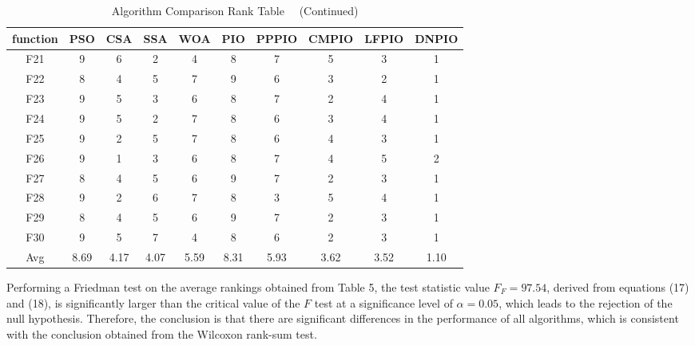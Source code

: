 \documentclass[preprint,review,compress,12pt]{elsarticle}
\begin{document}
\begin{table}[H]
\renewcommand{\thetable}{5}
\centering
\caption{Algorithm Comparison Rank Table \ \ (Continued)}
\begin{tabular}{cccccccccc}
\toprule
function   & PSO  & CSA  & SSA  & WOA  & PIO  & PPPIO & CMPIO & LFPIO & DNPIO \\
\midrule
F21 & 9    & 6    & 2    & 4    & 8    & 7     & 5     & 3     & 1     \\
F22 & 8    & 4    & 5    & 7    & 9    & 6     & 3     & 2     & 1     \\
F23 & 9    & 5    & 3    & 6    & 8    & 7     & 2     & 4     & 1     \\
F24 & 9    & 5    & 2    & 7    & 8    & 6     & 3     & 4     & 1     \\
F25 & 9    & 2    & 5    & 7    & 8    & 6     & 4     & 3     & 1     \\
F26 & 9    & 1    & 3    & 6    & 8    & 7     & 4     & 5     & 2     \\
F27 & 8    & 4    & 5    & 6    & 9    & 7     & 2     & 3     & 1     \\
F28 & 9    & 2    & 6    & 7    & 8    & 3     & 5     & 4     & 1     \\
F29 & 8    & 4    & 5    & 6    & 9    & 7     & 2     & 3     & 1     \\
F30 & 9    & 5    & 7    & 4    & 8    & 6     & 2     & 3     & 1     \\
\midrule
Avg & 8.69 & 4.17 & 4.07 & 5.59 & 8.31 & 5.93  & 3.62  & 3.52  & 1.10 \\
\bottomrule
\end{tabular}
\end{table}


Performing a Friedman test on the average rankings obtained from Table 5, the test statistic value $F _F=97.54$, derived from equations (17) and (18), is significantly larger than the critical value of the $F$ test at a significance level of $\alpha=0.05$, which leads to the rejection of the null hypothesis. Therefore, the conclusion is that there are significant differences in the performance of all algorithms, which is consistent with the conclusion obtained from the Wilcoxon rank-sum test.
\end{document}
